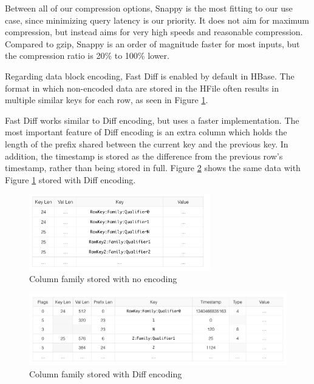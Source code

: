 Between all of our compression options, Snappy \cite{snappy} is the most fitting to our use case, since minimizing query latency is our priority. It does not aim for maximum compression, but instead aims for very high speeds and reasonable compression. Compared to gzip, Snappy is an order of magnitude faster for most inputs, but the compression ratio is 20\% to 100\% lower. 

Regarding data block encoding, Fast Diff \cite{hbase_reference} is enabled by default in HBase. The format in which non-encoded data are stored in the HFile often results in multiple similar keys for each row, as seen in Figure \ref{figure:optimizations_no_encoding}.

Fast Diff works similar to Diff encoding, but uses a faster implementation. The most important feature of Diff encoding is an extra column which holds the length of the prefix shared between the current key and the previous key. In addition, the timestamp is stored as the difference from the previous row's timestamp, rather than being stored in full. Figure \ref{figure:optimizations_diff_encoding} shows the same data with Figure \ref{figure:optimizations_no_encoding} stored with Diff encoding.

\begin{figure}[h!]
\centering
\includegraphics[width=0.7\textwidth]{figures/optimizations_no_encoding}
\caption{Column family stored with no encoding}
\label{figure:optimizations_no_encoding}
\end{figure}

\begin{figure}[h!]
\centering
\includegraphics[width=\textwidth]{figures/optimizations_diff_encoding}
\caption{Column family stored with Diff encoding}
\label{figure:optimizations_diff_encoding}
\end{figure}

